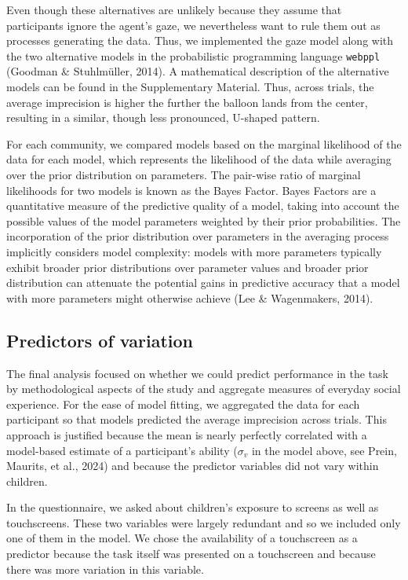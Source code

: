 \documentclass[
  man,floatsintext]{apa7}
\begin{document}
Even though these alternatives are unlikely because they assume that participants ignore the agent's gaze, we nevertheless want to rule them out as processes generating the data. Thus, we implemented the gaze model along with the two alternative models in the probabilistic programming language \texttt{webppl} (Goodman \& Stuhlmüller, 2014). A mathematical description of the alternative models can be found in the Supplementary Material. Thus, across trials, the average imprecision is higher the further the balloon lands from the center, resulting in a similar, though less pronounced, U-shaped pattern.

For each community, we compared models based on the marginal likelihood of the data for each model, which represents the likelihood of the data while averaging over the prior distribution on parameters. The pair-wise ratio of marginal likelihoods for two models is known as the Bayes Factor. Bayes Factors are a quantitative measure of the predictive quality of a model, taking into account the possible values of the model parameters weighted by their prior probabilities. The incorporation of the prior distribution over parameters in the averaging process implicitly considers model complexity: models with more parameters typically exhibit broader prior distributions over parameter values and broader prior distribution can attenuate the potential gains in predictive accuracy that a model with more parameters might otherwise achieve (Lee \& Wagenmakers, 2014).

\subsection{Predictors of variation}\label{predictors-of-variation}

The final analysis focused on whether we could predict performance in the task by methodological aspects of the study and aggregate measures of everyday social experience. For the ease of model fitting, we aggregated the data for each participant so that models predicted the average imprecision across trials. This approach is justified because the mean is nearly perfectly correlated with a model-based estimate of a participant's ability (\(\sigma_v\) in the model above, see Prein, Maurits, et al., 2024) and because the predictor variables did not vary within children.

In the questionnaire, we asked about children's exposure to screens as well as touchscreens. These two variables were largely redundant and so we included only one of them in the model. We chose the availability of a touchscreen as a predictor because the task itself was presented on a touchscreen and because there was more variation in this variable.
\end{document}
